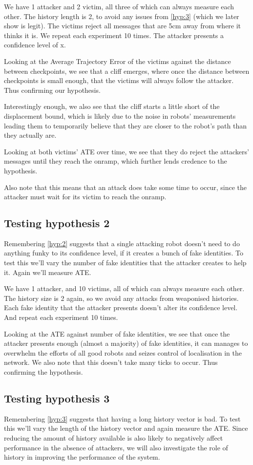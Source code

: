 We have 1 attacker and 2 victim, all three of which can always measure each other. The history length is 2, to avoid any issues from \ref{hyp:3} (which we later show is legit). The victims reject all messages that are 5cm away from where it thinks it is. We repeat each experiment 10 times. The attacker presents a confidence level of x.

Looking at the Average Trajectory Error of the victims against the distance between checkpoints, we see that a cliff emerges, where once the distance between checkpoints is small enough, that the victims will always follow the attacker. Thus confirming our hypothesis. 

Interestingly enough, we also see that the cliff starts a little short of the displacement bound, which is likely due to the noise in robots' measurements leading them to temporarily believe that they are closer to the robot's path than they actually are.

Looking at both victims' ATE over time, we see that they do reject the attackers' messages until they reach the onramp, which further lends credence to the hypothesis.

Also note that this means that an attack does take some time to occur, since the attacker must wait for its victim to reach the onramp.

\subsection{Testing hypothesis 2}
Remembering \ref{hyp:2} suggests that a single attacking robot doesn't need to do anything funky to its confidence level, if it creates a bunch of fake identities. To test this we'll vary the number of fake identities that the attacker creates to help it. Again we'll measure ATE.

We have 1 attacker, and 10 victims, all of which can always measure each other. The history size is 2 again, so we avoid any attacks from weaponised histories. Each fake identity that the attacker presents doesn't alter its confidence level. And repeat each experiment 10 times.

Looking at the ATE against number of fake identities, we see that once the attacker presents enough (almost a majority) of fake identities, it can manages to overwhelm the efforts of all good robots and seizes control of localisation in the network. We also note that this doesn't take many ticks to occur. Thus confirming the hypothesis.

\subsection{Testing hypothesis 3}
Remembering \ref{hyp:3} suggests that having a long history vector is bad. To test this we'll vary the length of the history vector and again measure the ATE. Since reducing the amount of history available is also likely to negatively affect performance in the absence of attackers, we will also investigate the role of history in improving the performance of the system.

